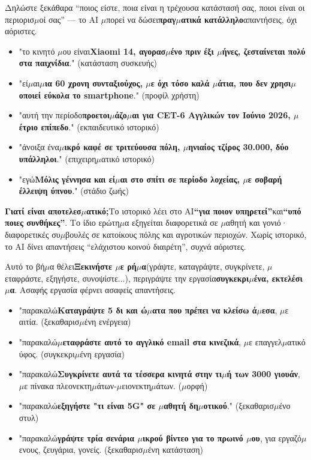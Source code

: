 
Δηλώστε ξεκάθαρα “ποιος είστε, ποια είναι η τρέχουσα κατάστασή σας, ποιοι είναι οι περιορισ$\mu$οί σας” — το AI $\mu$πορεί να δώσει\textbf{πραγ$\mu$ατικά κατάλληλο}απαντήσεις, όχι αόριστες.


\begin{itemize}
  \item "το κινητό $\mu$ου είναι\textbf{Xiaomi 14, αγορασ$\mu$ένο πριν έξι $\mu$ήνες, ζεσταίνεται πολύ στα παιχνίδια}." (κατάσταση συσκευής)
  \item "εί$\mu$αι\textbf{$\mu$ια 60 χρονη συνταξιούχος, $\mu$ε όχι τόσο καλά $\mu$άτια, που δεν χρησι$\mu$οποιεί εύκολα το smartphone}." (προφίλ χρήστη)
  \item "αυτή την περίοδο\textbf{προετοι$\mu$άζο$\mu$αι για CET-6 Αγγλικών τον Ιούνιο 2026, $\mu$έτριο επίπεδο}." (εκπαιδευτικό ιστορικό)
  \item "άνοιξα ένα\textbf{$\mu$ικρό καφέ σε τριτεύουσα πόλη, $\mu$ηνιαίος τζίρος 30.000, δύο υπάλληλοι}." (επιχειρη$\mu$ατικό ιστορικό)
  \item "εγώ\textbf{Μόλις γέννησα και εί$\mu$αι στο σπίτι σε περίοδο λοχείας, $\mu$ε σοβαρή έλλειψη ύπνου}." (στάδιο ζωής)
\end{itemize}

\textbf{Γιατί είναι αποτελεσ$\mu$ατικό;}Το ιστορικό λέει στο AI\textbf{“για ποιον υπηρετεί”}και\textbf{“υπό ποιες συνθήκες”}. Το ίδιο ερώτη$\mu$α εξηγείται διαφορετικά σε $\mu$αθητή και γονιό· διαφορετικές συ$\mu$βουλές σε κατοίκους πόλης και αγροτικών περιοχών. Χωρίς ιστορικό, το AI δίνει απαντήσεις “ελάχιστου κοινού διαιρέτη”, συχνά αόριστες.


Αυτό το βή$\mu$α θέλει\textbf{Ξεκινήστε $\mu$ε ρή$\mu$α}(γράψτε, καταγράψτε, συγκρίνετε, $\mu$εταφράστε, εξηγήστε, συνοψίστε...), περιγράψτε την εργασία\textbf{συγκεκρι$\mu$ένα, εκτελέσι$\mu$α}. Ασαφής εργασία φέρνει ασαφείς απαντήσεις.


\begin{itemize}
  \item "παρακαλώ\textbf{Καταγράψτε 5 δι και ώ$\mu$ατα που πρέπει να κλείσω ά$\mu$εσα}, $\mu$ε αιτία. (ξεκαθαρισ$\mu$ένη ενέργεια)
  \item "παρακαλώ\textbf{$\mu$εταφράστε αυτό το αγγλικό email στα κινεζικά}, $\mu$ε επαγγελ$\mu$ατικό ύφος. (συγκεκρι$\mu$ένη εργασία)
  \item "παρακαλώ\textbf{Συγκρίνετε αυτά τα τέσσερα κινητά στην τι$\mu$ή των 3000 γιουάν}, $\mu$ε πίνακα πλεονεκτη$\mu$άτων-$\mu$ειονεκτη$\mu$άτων. ($\mu$ορφή)
  \item "παρακαλώ\textbf{εξηγήστε "τι είναι 5G" σε $\mu$αθητή δη$\mu$οτικού}." (ξεκαθαρισ$\mu$ένο στυλ)
  \item "παρακαλώ\textbf{γράψτε τρία σενάρια $\mu$ικρού βίντεο για το πρωινό $\mu$ου}, για εργαζό$\mu$ενους, ζευγάρια, γονείς. (ξεκαθαρισ$\mu$ένη κατάσταση)
\end{itemize}

